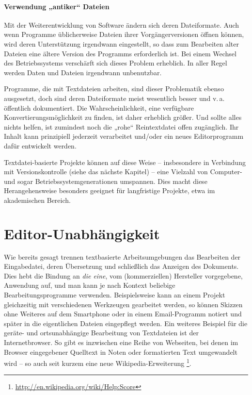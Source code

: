 \documentclass[DIV=12]{scrreprt}
\begin{document}
\paragraph{Verwendung „antiker“ Dateien}
Mit der Weiterentwicklung von Software ändern sich deren Dateiformate.
Auch wenn Programme üblicherweise Dateien ihrer Vorgängerversionen öffnen können, wird deren Unterstützung irgendwann eingestellt, so dass zum Bearbeiten alter Dateien eine ältere Version des Programms erforderlich ist.
Bei einem Wechsel des Betriebssystems verschärft sich dieses Problem erheblich.
In aller Regel werden Daten und Dateien irgendwann unbenutzbar.

Programme, die mit Textdateien arbeiten, sind dieser Problematik ebenso ausgesetzt, doch sind deren Dateiformate meist wesentlich besser und v.\,a. öffentlich dokumentiert.
Die Wahrscheinlichkeit, eine verfügbare Konvertierungsmöglichkeit zu finden, ist daher erheblich größer.
Und sollte alles nichts helfen, ist zumindest noch die „rohe“ Reintextdatei offen zugänglich.
Ihr Inhalt kann prinzipiell jederzeit verarbeitet und/oder ein neues Editorprogramm dafür entwickelt werden.

Textdatei-basierte Projekte können auf diese Weise -- insbesondere in Verbindung mit Versionskontrolle (siehe das nächste Kapitel) -- eine Vielzahl von Computer- und sogar Betriebssystemgenerationen umspannen.
Dies macht diese Herangehensweise besonders geeignet für langfristige Projekte, etwa im akademischen Bereich.

\section{Editor-Unabhängigkeit}
\label{sec:pt_editor-independence}
Wie bereits gesagt trennen textbasierte Arbeitsumgebungen das Bearbeiten der Eingabedatei, deren Übersetzung und schließlich das Anzeigen des Dokuments.
Dies hebt die Bindung an \emph{die eine}, vom (kommerziellen) Hersteller vorgegebene, Anwendung auf, und man kann je nach Kontext beliebige Bearbeitungsprogramme verwenden.
Beispielsweise kann an einem Projekt gleichzeitig mit verschiedenen Werkzeugen gearbeitet werden, so können Skizzen ohne Weiteres auf dem Smartphone oder in einem Email-Programm notiert und später in die eigentlichen Dateien eingepflegt werden.
Ein weiteres Beispiel für die geräte- und ortsunabhängige Bearbeitung von Textdateien ist der Internetbrowser.
So gibt es inzwischen eine Reihe von Webseiten, bei denen im Browser eingegebener Quelltext in Noten oder formatierten Text umgewandelt wird -- so auch seit kurzem eine neue Wikipedia-Erweiterung%
\footnote{\url{http://en.wikipedia.org/wiki/Help:Score}}.
\end{document}
